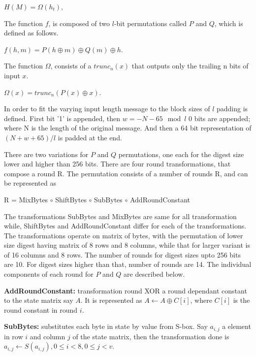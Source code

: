 \documentclass[12pt]{artikel3}                  %
\begin{document}
\begin{center}$H(M) = \Omega(h_{t}),$\end{center}

The function $f$, is composed of two $l$-bit permutations called $P$ and $Q$, which is defined as follows.

\begin{center}$f(h, m) = P(h \oplus m) \oplus Q(m) \oplus h.$\end{center}

The function $\Omega$, consists of a $trunc_{n}(x)$ that outputs only the trailing n bits of input $x$.
\begin{center}$\Omega(x) = trunc_{n}( P(x) \oplus x ).$\end{center}

In order to fit the varying input length message to the block sizes of $l$ padding is defined. First bit '1' is
appended, then $ w = -N - 65 \mod l $ 0 bits are appended; where N is the length of the original message. And then
a 64 bit representation of $(N + w + 65) / l $ is padded at the end.

There are two variations for $P$ and $Q$ permutations, one each for the digest size lower and higher than 256 bits. There
are four round transformations, that compose a round R. The permutation consists of a number of rounds R, and can be
represented as 

\begin{center} R = MixBytes $\circ$ ShiftBytes $\circ$ SubBytes $\circ$ AddRoundConstant \end{center}

The transformations SubBytes and MixBytes are same for all transformation while, ShiftBytes and AddRoundConstant differ
for each of the transformations. The transformations operate on matrix of bytes, with the permutation of lower size
digest having matrix of 8 rows and 8 columns, while that for larger variant is of 16 columns and 8 rows. The number of
rounds for digest sizes upto 256 bits are 10. For digest sizes higher than that, number of rounds are 14. The individual
components of each round for $P$ and $Q$ are described below.

{\bf AddRoundConstant:} transformation round XOR a round dependant constant to the state matrix say $A$. It is 
represented as $A \gets A \oplus C[i]$, where $C[i]$ is the round constant in round $i$.

{\bf SubBytes:} substitutes each byte in state by value from S-box. Say $a_{i,j}$ a element in row $i$ and column $j$
of the state matrix, then the transformation done is $a_{i,j} \gets S( a_{i,j}),  0 \leq i < 8, 0 \leq j < v.$
\end{document}
